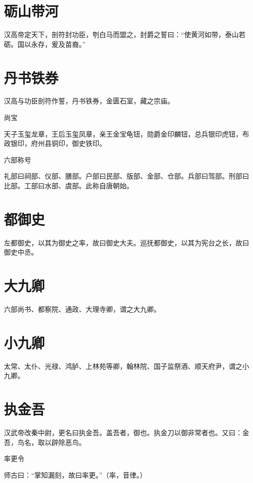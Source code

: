 \documentclass[a4paper,12pt,UTF8,twoside]{ctexbook}
\begin{document}
    \section{砺山带河}
    
    汉高帝定天下，剖符封功臣，刳白马而盟之，封爵之誓曰：“使黄河如带，泰山若砺。国以永存，爰及苗裔。”
    
    \section{丹书铁券}
    
    汉高与功臣剖符作誓，丹书铁券，金匮石室，藏之宗庙。
    
    尚宝
    
    天子玉玺龙章，王后玉玺凤章，亲王金宝龟钮，勋爵金印麟钮，总兵银印虎钮，布政银印，府州县铜印，御史铁印。
    
    六部称号
    
    礼部曰祠部、仪部、膳部。户部曰民部、版部、金部、仓部。兵部曰驾部。刑部曰比部。工部曰水部、虞部。此称自唐朝始。
    
    \section{都御史}
    
    左都御史，以其为御史之率，故曰御史大夫。巡抚都御史，以其为宪台之长，故曰御史中丞。
    
    \section{大九卿}
    
    六部尚书、都察院、通政、大理寺卿，谓之大九卿。
    
    \section{小九卿}
    
    太常、太仆、光禄、鸿胪、上林苑等卿，翰林院、国子监祭酒、顺天府尹，谓之小九卿。
    
    \section{执金吾}
    
    汉武帝改秦中尉，更名曰执金吾。盖吾者，御也。执金刀以御非常者也。又曰：金吾，鸟名，取以辟除恶鸟。
    
    率更令
    
    师古曰：“掌知漏刻，故曰率更。”（率，音律。）
    
\end{document}
